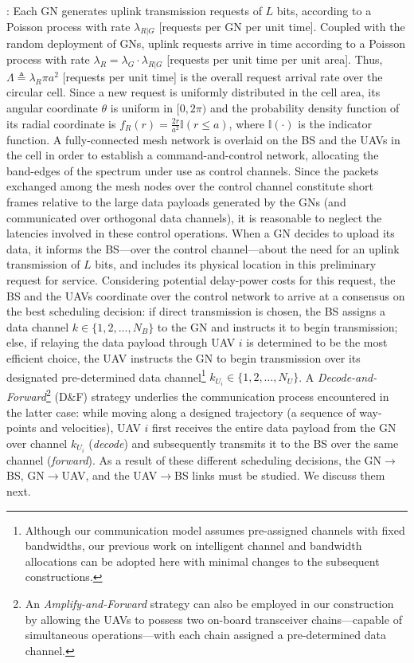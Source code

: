 \documentclass[12pt, draftcls, onecolumn]{IEEEtran}
\theoremstyle{plain}
\theoremstyle{definition}
\theoremstyle{remark}
\begin{document}
: Each GN generates uplink transmission requests of $L$ bits, according to a Poisson process with rate $\lambda_{R{|}G}$ [requests per GN per unit time]. Coupled with the random deployment of GNs, uplink requests arrive in time according to a Poisson process with rate $\lambda_{R}{=}\lambda_{G}{\cdot}\lambda_{R{|}G}$ [requests per unit time per unit area]. Thus, $\Lambda{\triangleq}\lambda_{R}\pi a^{2}$ [requests per unit time] is the overall request arrival rate over the circular cell. Since a new request is uniformly distributed in the cell area, its angular coordinate $\theta$ is uniform in $[0,2\pi)$ and the probability density function of its radial coordinate is $f_{R}(r){=}\frac{2r}{a^2}\mathbb{I}(r{\leq}a)$, where $\mathbb{I}(\cdot)$ is the indicator function. A fully-connected mesh network is overlaid on the BS and the UAVs in the cell in order to establish a command-and-control network, allocating the band-edges of the spectrum under use as control channels. Since the packets exchanged among the mesh nodes over the control channel constitute short frames relative to the large data payloads generated by the GNs (and communicated over orthogonal data channels), it is reasonable to neglect the latencies involved in these control operations. When a GN decides to upload its data, it informs the BS---over the control channel---about the need for an uplink transmission of $L$ bits, and includes its physical location in this preliminary request for service. Considering potential delay-power costs for this request, the BS and the UAVs coordinate over the control network to arrive at a consensus on the best scheduling decision: if direct transmission is chosen, the BS assigns a data channel $k{\in}\{1,2,{\dots},N_{B}\}$ to the GN and instructs it to begin transmission; else, if relaying the data payload through UAV $i$ is determined to be the most efficient choice, the UAV instructs the GN to begin transmission over its designated pre-determined data channel\footnote{Although our communication model assumes pre-assigned channels with fixed bandwidths, our previous work on intelligent channel and bandwidth allocations \cite{TCCN} can be adopted here with minimal changes to the subsequent constructions.} $k_{U_{i}}{\in}\{1,2,{\dots},N_{U}\}$. A \emph{Decode-and-Forward}\footnote{An \emph{Amplify-and-Forward} strategy \cite{AmplifyForward} can also be employed in our construction by allowing the UAVs to possess two on-board transceiver chains---capable of simultaneous operations---with each chain assigned a pre-determined data channel.} (D\&F) strategy underlies the communication process encountered in the latter case: while moving along a designed trajectory (a sequence of way-points and velocities), UAV $i$ first receives the entire data payload from the GN over channel $k_{U_{i}}$ (\emph{decode}) and subsequently transmits it to the BS over the same channel (\emph{forward}). As a result of these different scheduling decisions, the GN$\rightarrow$BS, GN$\rightarrow$UAV, and the UAV$\rightarrow$BS links must be studied. We discuss them next.
\end{document}
